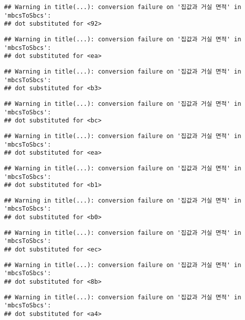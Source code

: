 \documentclass[
]{article}
\begin{document}
\begin{verbatim}
## Warning in title(...): conversion failure on '집값과 거실 면적' in 'mbcsToSbcs':
## dot substituted for <92>
\end{verbatim}

\begin{verbatim}
## Warning in title(...): conversion failure on '집값과 거실 면적' in 'mbcsToSbcs':
## dot substituted for <ea>
\end{verbatim}

\begin{verbatim}
## Warning in title(...): conversion failure on '집값과 거실 면적' in 'mbcsToSbcs':
## dot substituted for <b3>
\end{verbatim}

\begin{verbatim}
## Warning in title(...): conversion failure on '집값과 거실 면적' in 'mbcsToSbcs':
## dot substituted for <bc>
\end{verbatim}

\begin{verbatim}
## Warning in title(...): conversion failure on '집값과 거실 면적' in 'mbcsToSbcs':
## dot substituted for <ea>
\end{verbatim}

\begin{verbatim}
## Warning in title(...): conversion failure on '집값과 거실 면적' in 'mbcsToSbcs':
## dot substituted for <b1>
\end{verbatim}

\begin{verbatim}
## Warning in title(...): conversion failure on '집값과 거실 면적' in 'mbcsToSbcs':
## dot substituted for <b0>
\end{verbatim}

\begin{verbatim}
## Warning in title(...): conversion failure on '집값과 거실 면적' in 'mbcsToSbcs':
## dot substituted for <ec>
\end{verbatim}

\begin{verbatim}
## Warning in title(...): conversion failure on '집값과 거실 면적' in 'mbcsToSbcs':
## dot substituted for <8b>
\end{verbatim}

\begin{verbatim}
## Warning in title(...): conversion failure on '집값과 거실 면적' in 'mbcsToSbcs':
## dot substituted for <a4>
\end{verbatim}
\end{document}
